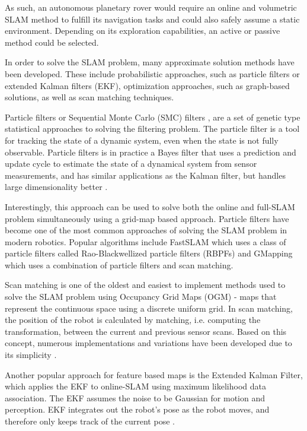 As such, an autonomous planetary rover would require an online and volumetric
SLAM method to fulfill its navigation tasks and could also safely assume a
static environment.
Depending on its exploration capabilities, an active or passive method
could be selected.

In order to solve the SLAM problem, many approximate solution methods
have been developed.
These include probabilistic approaches, such as particle filters or extended
Kalman filters (EKF), optimization approaches, such as graph-based solutions,
as well as scan matching techniques.

Particle filters or Sequential Monte Carlo (SMC) filters
\parencite{Doucet2001, Murphy1999}, are a set of genetic type statistical
approaches to solving the filtering problem.
The particle filter is a tool for tracking the state of a dynamic system,
even when the state is not fully observable.
Particle filters is in practice a Bayes filter that uses a prediction
and update cycle to estimate the state of a dynamical system from
sensor measurements, and has similar applications as the Kalman filter,
but handles large dimensionality better \parencite{Thrun2005}.

Interestingly, this approach can be used to solve both the online and
full-SLAM problem simultaneously using a grid-map based approach.
Particle filters have become one of the most common approaches of
solving the SLAM problem in modern robotics.
Popular algorithms include FastSLAM \parencite{Montemerlo2002} which
uses a class of particle filters called Rao-Blackwellized particle filters
(RBPFs) \parencite{Doucet2000, Murphy2001} and GMapping
\parencite{Grisettiyz2005} which uses a combination of particle filters
and scan matching.

Scan matching is one of the oldest and easiest to implement methods used
to solve the SLAM problem using Occupancy Grid Maps (OGM) - maps that
represent the continuous space using a discrete uniform grid.
In scan matching, the position of the robot is calculated by matching,
i.e. computing the transformation, between the current and previous
sensor scans.
Based on this concept, numerous implementations and variations have
been developed due to its simplicity \parencite{Rusinkiewicz2001, Brenna2008}.

Another popular approach for feature based maps is the Extended Kalman Filter,
which applies the EKF to online-SLAM using maximum likelihood data association.
The EKF assumes the noise to be Gaussian for motion and perception.
EKF integrates out the robot's pose as the robot moves, and therefore only
keeps track of the current pose \parencite{Thrun2005}.

